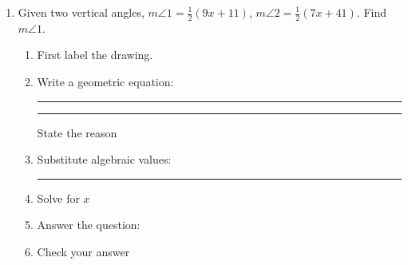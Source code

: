 \documentclass[12pt, oneside]{article}
\begin{document}
\begin{enumerate}
\newpage
    \item Given two vertical angles, $m \angle 1 = \frac{1}{2}(9x+11)$, $m \angle 2 = \frac{1}{2}(7x+41)$. Find $m \angle 1$.
    \begin{enumerate}
      \item First label the drawing.
      \begin{flushright}
      \end{flushright}
      \vspace{1cm}
      \item Write a geometric equation: \rule{4cm}{0.15mm} \hspace{1cm} \rule{4cm}{0.15mm}
      \begin{flushright} State the reason \end{flushright}
      \vspace{.7cm}
      \item Substitute algebraic values: \rule{4cm}{0.15mm}
      \item Solve for $x$
      \vspace{4cm}
      \item Answer the question:
      \vspace{3cm}
      \item Check your answer
    \end{enumerate}

  \end{enumerate}
\end{document}
